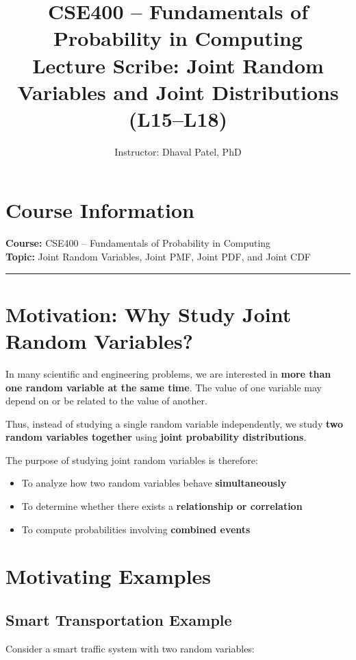 \documentclass[12pt]{article}
\title{CSE400 -- Fundamentals of Probability in Computing\\
Lecture Scribe: Joint Random Variables and Joint Distributions (L15--L18)}
\author{Instructor: Dhaval Patel, PhD}
\date{}
\begin{document}
\maketitle

\section*{Course Information}

\textbf{Course:} CSE400 -- Fundamentals of Probability in Computing \\
\textbf{Topic:} Joint Random Variables, Joint PMF, Joint PDF, and Joint CDF

\hrule
\vspace{0.5cm}

\section{Motivation: Why Study Joint Random Variables?}

In many scientific and engineering problems, we are interested in \textbf{more than one random variable at the same time}. The value of one variable may depend on or be related to the value of another.

Thus, instead of studying a single random variable independently, we study \textbf{two random variables together} using \textbf{joint probability distributions}.

The purpose of studying joint random variables is therefore:

\begin{itemize}
\item To analyze how two random variables behave \textbf{simultaneously}
\item To determine whether there exists a \textbf{relationship or correlation}
\item To compute probabilities involving \textbf{combined events}
\end{itemize}

\section{Motivating Examples}

\subsection{Smart Transportation Example}

Consider a smart traffic system with two random variables:
\end{document}
